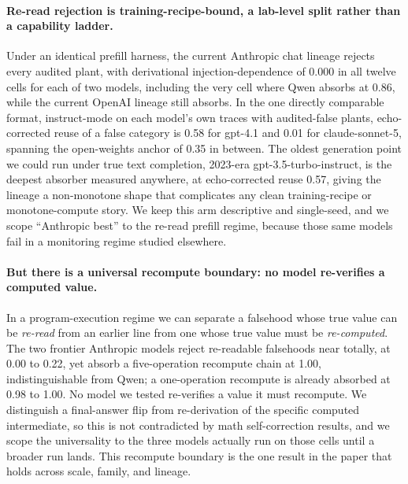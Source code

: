 \paragraph{Re-read rejection is training-recipe-bound, a lab-level split
rather than a capability ladder.} Under an identical prefill harness, the
current Anthropic chat lineage rejects every audited plant, with
derivational injection-dependence of 0.000 in all twelve cells for each of
two models, including the very cell where Qwen absorbs at 0.86, while the
current OpenAI lineage still absorbs.
In the one directly comparable format, instruct-mode on each model's own
traces with audited-false plants, echo-corrected reuse of a false category
is 0.58 for gpt-4.1 and 0.01 for claude-sonnet-5, spanning the open-weights
anchor of 0.35 in between.
The oldest generation point we could run under true text completion,
2023-era gpt-3.5-turbo-instruct, is the deepest absorber measured anywhere,
at echo-corrected reuse 0.57, giving the lineage a non-monotone shape that
complicates any clean training-recipe or monotone-compute story.
We keep this arm descriptive and single-seed, and we scope ``Anthropic
best'' to the re-read prefill regime, because those same models fail in a
monitoring regime studied elsewhere.

\paragraph{But there is a universal recompute boundary: no model
re-verifies a computed value.} In a program-execution regime we can
separate a falsehood whose true value can be \emph{re-read} from an earlier
line from one whose true value must be \emph{re-computed}. The two frontier
Anthropic models reject re-readable falsehoods near totally, at 0.00 to
0.22, yet absorb a five-operation recompute chain at 1.00, indistinguishable
from Qwen; a one-operation recompute is already absorbed at 0.98 to 1.00.
No model we tested re-verifies a value it must recompute. We distinguish a
final-answer flip from re-derivation of the specific computed intermediate,
so this is not contradicted by math self-correction results, and we scope
the universality to the three models actually run on those cells until a
broader run lands.
This recompute boundary is the one result in the paper that holds across
scale, family, and lineage.

